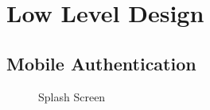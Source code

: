 \section{Low Level Design}
\subsection{Mobile Authentication}
\begin{figure}[H]
	\begin{center}
		\caption{Splash Screen}
	\end{center}
\end{figure}
